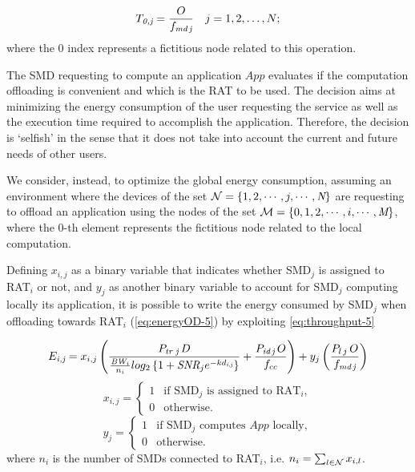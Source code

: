 \documentclass[twoside,openright]{report}
\begin{document}
\begin{equation}
\label{eq:timeL-5}
T_\textit{0,j} = \frac{O}{f_\textit{md\,j}} \quad j=1,2,\dots,N;
\end{equation}
where the 0 index represents a fictitious node related to this operation.

The \gls{SMD} requesting to compute an application $App$ evaluates if the computation offloading is convenient and which is the \gls{RAT} to be used. 
The decision aims at minimizing the energy consumption of the user requesting the service as well as the execution time required to accomplish the application. 
Therefore, the decision is `selfish' in the sense that it does not take into account the current and future needs of other users.

We consider, instead, to optimize the global energy consumption, assuming an environment where the devices of the set ${\cal{N}} = \{ 1, 2, \cdots, j, \cdots,  \textit{N} \}$ are requesting to offload an application using the nodes of the set ${\cal{M}} = \{ 0, 1, 2, \cdots, i, \cdots,  \textit{M} \}$, where the 0-th element represents the fictitious node related to the local computation. 

Defining $x_{i,j}$ as a binary variable that indicates whether SMD$_j$ is assigned to RAT$_i$ or not, and $y_j$ as another binary variable to account for SMD$_j$ computing locally its application,
it is possible to write the energy consumed by SMD$_j$ when offloading towards RAT$_i$ (\autoref{eq:energyOD-5}) by exploiting \autoref{eq:throughput-5} 

\begin{equation}
\label{eq:energyFunctionCost-5}
E_\textit{i,j} = x_{i,j}\left(\frac{P_\textit{tr j}\,D}{\frac{\textit{BW}_i}{n_i}log_2\left\{1+\textit{SNR}_j e^{-k d_\textit{i,j}} \right\}} + \frac{P_\textit{id\,j}\,O }{f_{cc}}\right)  
+ y_j \left( \frac{P_{l\,j}\,O}{f_\textit{md\,j}} \right) 
\end{equation}
\begin{equation*}
x_{i,j} = \begin{cases}
1& \text{if SMD$_j$ is assigned to RAT$_i$},\\
0& \text{otherwise}.
\end{cases}
\end{equation*}
\begin{equation*}
y_j = \begin{cases}
1& \text{if SMD$_j$ computes $App$ locally},\\
0& \text{otherwise}.
\end{cases}
\end{equation*}
where $n_i$ is the number of \glspl{SMD} connected to RAT$_i$, i.e. $n_i = \sum_{l \in \cal{N}} x_{i,l}$. 
\end{document}
